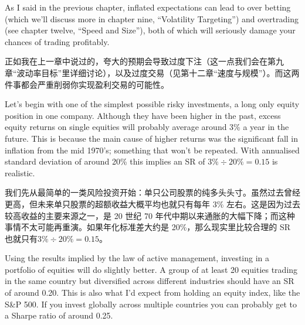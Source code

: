 \begin{englishblock} As I said in the previous chapter, inflated expectations can lead to over betting (which we'll discuss more in chapter nine, ``Volatility Targeting'') and overtrading (see chapter twelve, ``Speed and Size''), both of which will seriously damage your chances of trading profitably. \end{englishblock}

\begin{chineseblock}正如我在上一章中说过的，夸大的预期会导致过度下注（这一点我们会在第九章“波动率目标”里详细讨论），以及过度交易（见第十二章“速度与规模”）。而这两件事都会严重削弱你实现盈利交易的可能性。\end{chineseblock}

\bipairgap

\begin{englishblock} Let's begin with one of the simplest possible risky investments, a long only equity position in one company. Although they have been higher in the past, excess equity returns on single equities will probably average around 3\% a year in the future. This is because the main cause of higher returns was the significant fall in inflation from the mid 1970's; something that won't be repeated. With annualised standard deviation of around 20\% this implies an SR of $3\% \div 20\% = 0.15$ is realistic. \end{englishblock}

\begin{chineseblock}我们先从最简单的一类风险投资开始：单只公司股票的纯多头头寸。虽然过去曾经更高，但未来单只股票的超额收益大概平均也就只有每年 3\% 左右。这是因为过去较高收益的主要来源之一，是 20 世纪 70 年代中期以来通胀的大幅下降；而这种事情不太可能再重演。如果年化标准差大约是 20\%，那么现实里比较合理的 SR 也就只有\(3\% \div 20\% = 0.15\)。\end{chineseblock}

\bipairgap

\begin{englishblock} Using the results implied by the law of active management, investing in a portfolio of equities will do slightly better. A group of at least 20 equities trading in the same country but diversified across different industries should have an SR of around 0.20. This is also what I'd expect from holding an equity index, like the S\&P 500. If you invest globally across multiple countries you can probably get to a Sharpe ratio of around 0.25. \end{englishblock}

